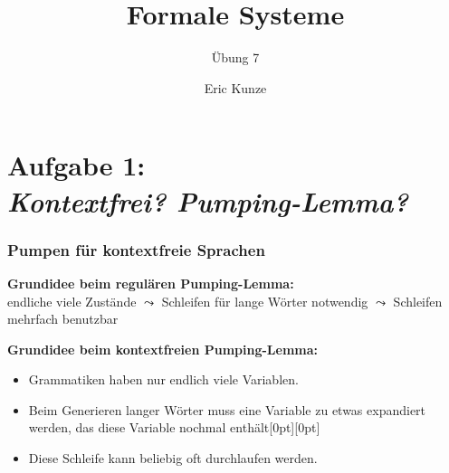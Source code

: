 \documentclass{beamer}
\newcommand{\ghost}[1]{\raisebox{0pt}[0pt][0pt]{\makebox[0pt][l]{#1}}}
\begin{document}
	
	\title{Formale Systeme}
	\subtitle{Übung 7}
	\author{Eric Kunze}
	\date{}

	\maketitle

	

	\section{Aufgabe 1: \\ \itshape Kontextfrei? Pumping-Lemma?}

	\newcommand{\colstackrel}[3]{\,{\stackrel{\textcolor{#3}{#1}}{\textcolor{#3}{#2}}}\,}
	\newcommand{\gstackrel}[2]{\colstackrel{#1}{#2}{darkgreen}}
	\newcommand{\bstackrel}[2]{\colstackrel{#1}{#2}{darkblue}}
	\newcommand{\rstackrel}[2]{\colstackrel{#1}{#2}{darkred}}
	
	\begin{frame}\frametitle{Pumpen für kontextfreie Sprachen}
		\footnotesize	
		\textbf{Grundidee beim regulären Pumping-Lemma:} \\
		endliche viele Zustände $\leadsto$ Schleifen für lange Wörter notwendig $\leadsto$ Schleifen mehrfach benutzbar
		\pause
		
		\textbf{Grundidee beim kontextfreien Pumping-Lemma:}
		\begin{itemize}
			\item Grammatiken haben nur endlich viele Variablen.
			\item Beim Generieren langer Wörter muss eine Variable zu etwas expandiert werden, das diese Variable nochmal enthält\ghost{:}\\
			\item Diese Schleife kann beliebig oft durchlaufen werden.
		\end{itemize}
	
	\end{frame}
	
\end{document}
